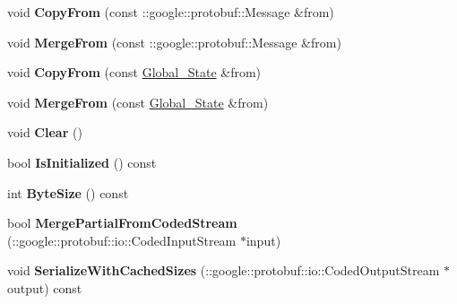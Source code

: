 \begin{DoxyCompactItemize}
\item 
void {\bfseries Copy\+From} (const \+::google\+::protobuf\+::\+Message \&from)\hypertarget{classvss__state_1_1Global__State_a5a57651faea985db08eafee9429407d0}{}\label{classvss__state_1_1Global__State_a5a57651faea985db08eafee9429407d0}

\item 
void {\bfseries Merge\+From} (const \+::google\+::protobuf\+::\+Message \&from)\hypertarget{classvss__state_1_1Global__State_ad2905d67a08d3e766963be4d20438dee}{}\label{classvss__state_1_1Global__State_ad2905d67a08d3e766963be4d20438dee}

\item 
void {\bfseries Copy\+From} (const \hyperlink{classvss__state_1_1Global__State}{Global\+\_\+\+State} \&from)\hypertarget{classvss__state_1_1Global__State_aba34386a742582208d2ead2116512710}{}\label{classvss__state_1_1Global__State_aba34386a742582208d2ead2116512710}

\item 
void {\bfseries Merge\+From} (const \hyperlink{classvss__state_1_1Global__State}{Global\+\_\+\+State} \&from)\hypertarget{classvss__state_1_1Global__State_a429e2ccd5b142708a51a3bd069455f52}{}\label{classvss__state_1_1Global__State_a429e2ccd5b142708a51a3bd069455f52}

\item 
void {\bfseries Clear} ()\hypertarget{classvss__state_1_1Global__State_a9c2d7a9cf4dd3c01b53a749e25b0d0fb}{}\label{classvss__state_1_1Global__State_a9c2d7a9cf4dd3c01b53a749e25b0d0fb}

\item 
bool {\bfseries Is\+Initialized} () const \hypertarget{classvss__state_1_1Global__State_ab2c7e2d4af0cd33383e9a4bd1a83113f}{}\label{classvss__state_1_1Global__State_ab2c7e2d4af0cd33383e9a4bd1a83113f}

\item 
int {\bfseries Byte\+Size} () const \hypertarget{classvss__state_1_1Global__State_a10790a0ee8bcc6cff1f704ad0dce113c}{}\label{classvss__state_1_1Global__State_a10790a0ee8bcc6cff1f704ad0dce113c}

\item 
bool {\bfseries Merge\+Partial\+From\+Coded\+Stream} (\+::google\+::protobuf\+::io\+::\+Coded\+Input\+Stream $\ast$input)\hypertarget{classvss__state_1_1Global__State_a6441ee848d925dd1cd3bca5e30c28c7f}{}\label{classvss__state_1_1Global__State_a6441ee848d925dd1cd3bca5e30c28c7f}

\item 
void {\bfseries Serialize\+With\+Cached\+Sizes} (\+::google\+::protobuf\+::io\+::\+Coded\+Output\+Stream $\ast$output) const \hypertarget{classvss__state_1_1Global__State_a01a832c00539c849c8171ff3a228f0df}{}\label{classvss__state_1_1Global__State_a01a832c00539c849c8171ff3a228f0df}


\end{DoxyCompactItemize}
